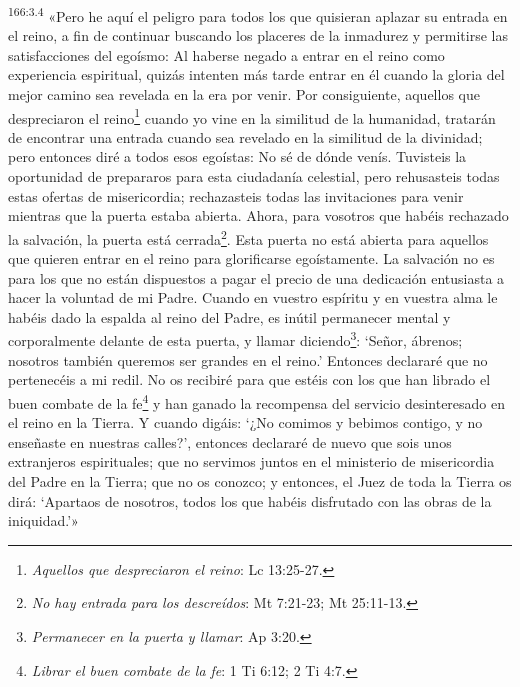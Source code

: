 \par 
\textsuperscript{166:3.4} «Pero he aquí el peligro para todos los que quisieran aplazar su entrada en el reino, a fin de continuar buscando los placeres de la inmadurez y permitirse las satisfacciones del egoísmo: Al haberse negado a entrar en el reino como experiencia espiritual, quizás intenten más tarde entrar en él cuando la gloria del mejor camino sea revelada en la era por venir. Por consiguiente, aquellos que despreciaron el reino\footnote{\textit{Aquellos que despreciaron el reino}: Lc 13:25-27.} cuando yo vine en la similitud de la humanidad, tratarán de encontrar una entrada cuando sea revelado en la similitud de la divinidad; pero entonces diré a todos esos egoístas: No sé de dónde venís. Tuvisteis la oportunidad de prepararos para esta ciudadanía celestial, pero rehusasteis todas estas ofertas de misericordia; rechazasteis todas las invitaciones para venir mientras que la puerta estaba abierta. Ahora, para vosotros que habéis rechazado la salvación, la puerta está cerrada\footnote{\textit{No hay entrada para los descreídos}: Mt 7:21-23; Mt 25:11-13.}. Esta puerta no está abierta para aquellos que quieren entrar en el reino para glorificarse egoístamente. La salvación no es para los que no están dispuestos a pagar el precio de una dedicación entusiasta a hacer la voluntad de mi Padre. Cuando en vuestro espíritu y en vuestra alma le habéis dado la espalda al reino del Padre, es inútil permanecer mental y corporalmente delante de esta puerta, y llamar diciendo\footnote{\textit{Permanecer en la puerta y llamar}: Ap 3:20.}: `Señor, ábrenos; nosotros también queremos ser grandes en el reino.' Entonces declararé que no pertenecéis a mi redil. No os recibiré para que estéis con los que han librado el buen combate de la fe\footnote{\textit{Librar el buen combate de la fe}: 1 Ti 6:12; 2 Ti 4:7.} y han ganado la recompensa del servicio desinteresado en el reino en la Tierra. Y cuando digáis: `¿No comimos y bebimos contigo, y no enseñaste en nuestras calles?', entonces declararé de nuevo que sois unos extranjeros espirituales; que no servimos juntos en el ministerio de misericordia del Padre en la Tierra; que no os conozco; y entonces, el Juez de toda la Tierra os dirá: `Apartaos de nosotros, todos los que habéis disfrutado con las obras de la iniquidad.'»

